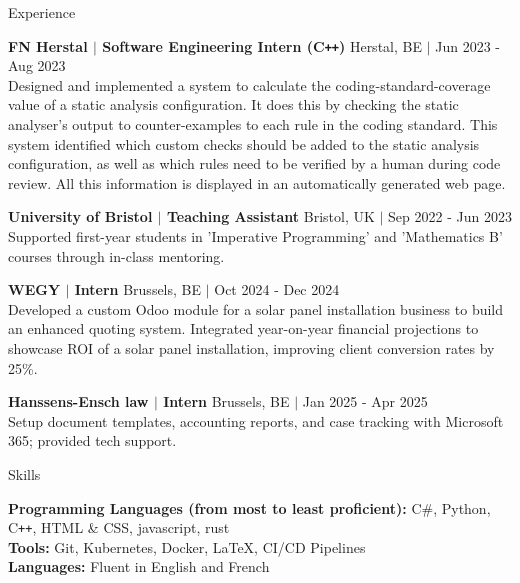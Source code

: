 \documentclass{resume} %
\begin{document}
\begin{rSection}{Experience}

\textbf{FN Herstal $\boldsymbol{\vert}$ Software Engineering Intern (C\texttt{++})} \hfill Herstal, BE $\boldsymbol{\vert}$ Jun 2023 - Aug 2023 \\
Designed and implemented a system to calculate the coding-standard-coverage value of a static analysis configuration. It does this by checking the static analyser's output to counter-examples to each rule in the coding standard. This system identified which custom checks should be added to the static analysis configuration, as well as which rules need to be verified by a human during code review. All this information is displayed in an automatically generated web page.

\textbf{University of Bristol $\boldsymbol{\vert}$ Teaching Assistant} \hfill Bristol, UK $\boldsymbol{\vert}$ Sep 2022 - Jun 2023 \\
Supported first-year students in 'Imperative Programming' and 'Mathematics B' courses through in-class mentoring.

\textbf{WEGY $\boldsymbol{\vert}$ Intern} \hfill Brussels, BE $\boldsymbol{\vert}$ Oct 2024 - Dec 2024 \\
Developed a custom Odoo module for a solar panel installation business to build an enhanced quoting system. Integrated year-on-year financial projections to showcase ROI of a solar panel installation, improving client conversion rates by 25\%. 

\textbf{Hanssens-Ensch law $\boldsymbol{\vert}$ Intern} \hfill Brussels, BE $\boldsymbol{\vert}$ Jan 2025 - Apr 2025 \\
Setup document templates, accounting reports, and case tracking with Microsoft 365; provided tech support.

\end{rSection}


\begin{rSection}{Skills}

{\bf Programming Languages (from most to least proficient):} C\#, Python, C\texttt{++}, HTML \& CSS, javascript, rust\\
{\bf Tools:} Git, Kubernetes, Docker, LaTeX, CI/CD Pipelines \\
{\bf Languages:} Fluent in English and French

\end{rSection}
\end{document}
